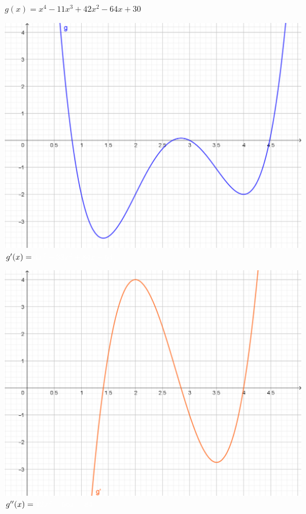 \documentclass[oneside]{book}
\begin{document}
	\begin{landscape}
		\centering
		\(g(x) = x^4 -11x^3 +42x^2 -64x +30\)\\
		\par\bigskip\noindent
		\includegraphics[scale=0.9]{Bilder/UB_fkt.png}
		\newpage
		\(g'(x) =\color{white}4x^3-33x^2+84x-64\)\\
		\par\bigskip\noindent
		\includegraphics[scale=0.9]{Bilder/UB_fkt'.png}
		\newpage
		\(g''(x) = \color{white}12x^2-66x+84\)\\
		\par\bigskip\noindent

\end{landscape}
\end{document}
